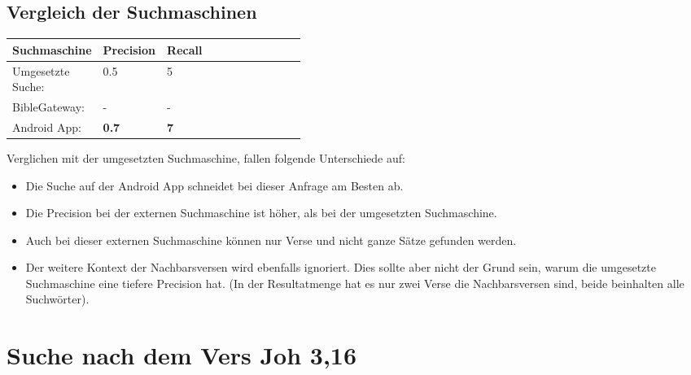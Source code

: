 \subsection{Vergleich der Suchmaschinen}
\begin{table}[H]
	\centering
	\small\renewcommand{\arraystretch}{1.4}
	\begin{tabularx}{0.9\textwidth}{ L{0.22\linewidth} | L{0.2\linewidth} | X }%
		\hline
		\textbf{Suchmaschine} & \textbf{Precision} & \textbf{Recall} \\ \hline \hline
		Umgesetzte Suche: & 0.5 & 5\\
		BibleGateway: & - & -\\
		Android App: & \textbf{0.7} & \textbf{7}\\
		\hline
	\end{tabularx}
\end{table}

Verglichen mit der umgesetzten Suchmaschine, fallen folgende Unterschiede auf:
\begin{itemize}[noitemsep]
	\item Die Suche auf der Android App schneidet bei dieser Anfrage am Besten ab.
	\item Die Precision bei der externen Suchmaschine ist höher, als bei der umgesetzten Suchmaschine. 
	\item Auch bei dieser externen Suchmaschine können nur Verse und nicht ganze Sätze gefunden werden.
	\item Der weitere Kontext der Nachbarsversen wird ebenfalls ignoriert.
	Dies sollte aber nicht der Grund sein, warum die umgesetzte Suchmaschine eine tiefere Precision hat. (In der Resultatmenge hat es nur zwei Verse die Nachbarsversen sind, beide beinhalten alle Suchwörter).
\end{itemize}



\newpage
\section{Suche nach dem Vers Joh 3,16}

